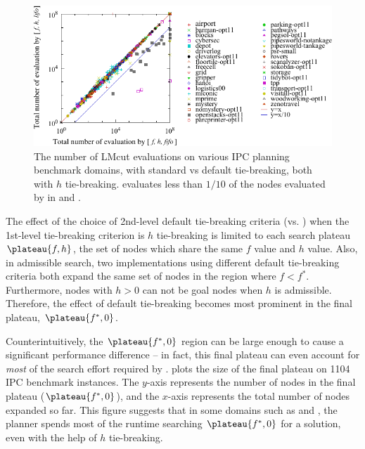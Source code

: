 \begin{figure}[tbp]
 \centering {}
 \includegraphics[width=\linewidth]{tables/aaai16-30min-5min-cut/aaai16prelim3/evaluated-lmcut_ff-lmcut_lf.pdf}
 \caption{The number of LMcut evaluations on various IPC planning benchmark domains,
 with standard \fifo vs \lifo default tie-breaking, both with $h$
 tie-breaking. \lifo evaluates  less than $1/10$ of the nodes evaluated
 by \fifo in  and . 
 }
 \label{fig:f-h-eval}
\end{figure}

The effect of the choice of 2nd-level default tie-breaking criteria (\lifo vs.
\fifo)  when the 1st-level tie-breaking criterion is  $h$ tie-breaking is
limited to each search plateau $\plateau{f,h}$, the set of nodes which
share the same $f$ value and $h$ value.
% 
Also, in admissible search, two \astar implementations using 
different default tie-breaking criteria both expand the same set of
nodes in the region where $f<f^*$.
% 
Furthermore, nodes with $h>0$ can not be goal nodes when $h$ is admissible.
% 
Therefore, the effect of default tie-breaking becomes most prominent in the final plateau, $\plateau{f^*,0}$.

Counterintuitively, the $\plateau{f^*, 0}$ region can be large enough to
cause a significant performance difference -- in fact, this final plateau can even account for \emph{most} of the
search effort required by \astar.
 plots the size of the final plateau on 1104 IPC
benchmark instances.  The $y$-axis represents the number of nodes in
the final plateau ($\plateau{f^*, 0}$), and the $x$-axis represents the total
number of nodes expanded so far. This figure suggests that in some
domains such as  and , the planner
spends most of the runtime searching $\plateau{f^*, 0}$ for a solution,
even with the help of $h$ tie-breaking.

